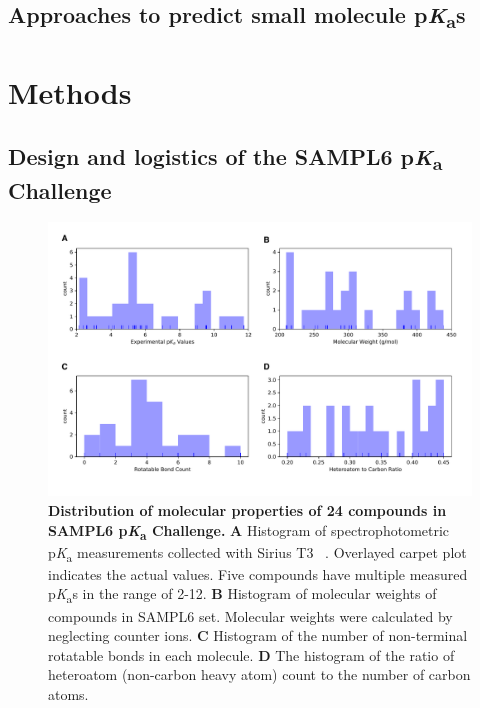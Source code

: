 \documentclass[9pt,lineno,final]{elife}
\newcommand{\pKa}{p\textit{K}\textsubscript{a}}
\begin{document}
\subsection{Approaches to predict small molecule \pKa{}s}



\section{Methods}

\subsection{Design and logistics of the SAMPL6 \pKa{} Challenge}

\begin{figure}
\begin{center}
\includegraphics[width=1.0\linewidth]{figures/distribution_of_molecular_properties.pdf}
\caption{{\bf Distribution of molecular properties of 24 compounds in SAMPL6 \pKa{} Challenge.} {\bf A} Histogram of spectrophotometric \pKa{} measurements collected with Sirius T3 ~\cite{Isik:2018:J.Comput.AidedMol.Des.}. Overlayed carpet plot indicates the actual values. Five compounds have multiple measured \pKa{}s in the range of 2-12. {\bf B} Histogram of molecular weights of compounds in SAMPL6 set. Molecular weights were calculated by neglecting counter ions. {\bf C} Histogram of the number of non-terminal rotatable bonds in each molecule. {\bf D} The histogram of the ratio of heteroatom (non-carbon heavy atom) count to the number of carbon atoms.
}
\label{fig:dist_mol_prop}
\end{center}
\end{figure}
\end{document}
